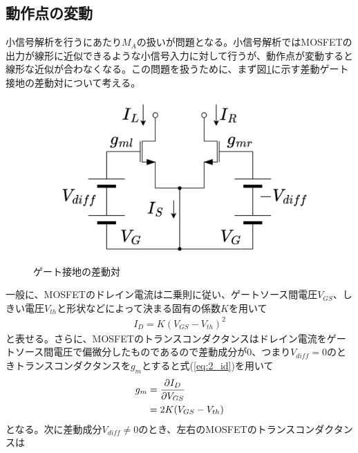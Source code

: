         \subsection{動作点の変動}
            小信号解析を行うにあたり$M_{A}$の扱いが問題となる。小信号解析ではMOSFETの出力が線形に近似できるような小信号入力に対して行うが、動作点が変動すると線形な近似が合わなくなる。この問題を扱うために、まず図\ref{fig:2_OP}に示す差動ゲート接地の差動対について考える。\\
            \begin{figure}
                \begin{center}
                    \includegraphics[width=160mm]{figures/chapter2/OperatingPoint.png}
                    \caption{ゲート接地の差動対}
                    \label{fig:2_OP}
                \end{center}
            \end{figure}
            一般に、MOSFETのドレイン電流は二乗則に従い、ゲートソース間電圧$V_{GS}$、しきい電圧$V_{th}$と形状などによって決まる固有の係数$K$を用いて
            \begin{align}
                I_{D}=K(V_{GS}-V_{th})^{2}  \label{eq:2_id}
            \end{align}
            と表せる。さらに、MOSFETのトランスコンダクタンスはドレイン電流をゲートソース間電圧で偏微分したものであるので差動成分が$0$、つまり$V_{diff}=0$のときトランスコンダクタンスを$g_{m}$とすると式(\ref{eq:2_id})を用いて
            \begin{align}
                g_{m}&=\frac{ \partial I_{D} }{ \partial V_{GS} }   \notag\\
                &=2K(V_{GS}-V_{th})     \label{eq:2_gm}
            \end{align}
            となる。次に差動成分$V_{diff}\neq0$のとき、左右のMOSFETのトランスコンダクタンスは
